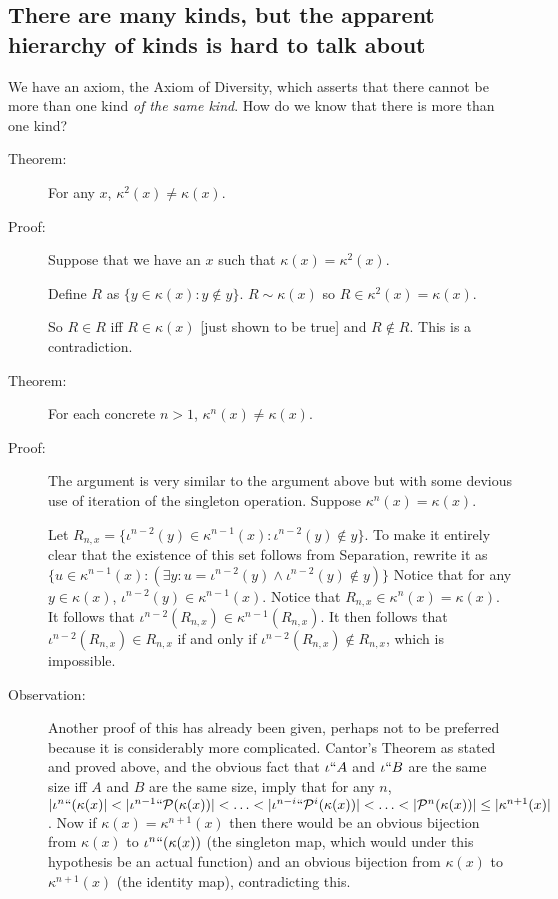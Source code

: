 \documentclass[12pt]{article}
\begin{document}
\subsection{There are many kinds, but the apparent hierarchy of kinds is hard to talk about}

We have an axiom, the Axiom of Diversity, which asserts that there cannot be more than one kind {\em of the same kind\/}.  How do we know that there is more than one kind?

\begin{description}

\item[Theorem:]  For any $x$, $\kappa^2(x) \neq \kappa(x)$.

\item[Proof:]  Suppose that we have an $x$ such that $\kappa(x) = \kappa^2(x)$.

Define $R$ as $\{y \in \kappa(x):y \not\in y\}$.  $R \sim \kappa(x)$ so $R \in \kappa^2(x) = \kappa(x)$.

So $R \in R$ iff $R \in \kappa(x)$ [just shown to be true] and $R \not\in R$.  This is a contradiction.



\item[Theorem:]  For each concrete $n>1$, $\kappa^n(x) \neq \kappa(x)$.

\item[Proof:]  The argument is very similar to the argument above but with some devious use of iteration of the singleton operation.  Suppose $\kappa^n(x)=\kappa(x)$.

Let $R_{n,x} = \{\iota^{n-2}(y)\in \kappa^{n-1}(x):\iota^{n-2}(y) \not\in y\}$.  To make it entirely clear that the existence of this set follows from Separation, rewrite it as $\{u\in \kappa^{n-1}(x):(\exists y:u = \iota^{n-2}(y) \wedge \iota^{n-2}(y) \not\in y)\}$ Notice that
for any $y \in \kappa(x)$, $\iota^{n-2}(y)\in \kappa^{n-1}(x)$.  Notice that $R_{n,x} \in \kappa^n(x) = \kappa(x)$.  It follows that $\iota^{n-2}(R_{n,x})\in \kappa^{n-1}(R_{n,x})$.  It then follows that
$\iota^{n-2}(R_{n,x})\in R_{n,x}$ if and only if $\iota^{n-2}(R_{n,x}) \not\in R_{n,x}$, which is impossible.

\item[Observation:]  Another proof of this has already been given, perhaps not to be preferred because it is considerably more complicated.  Cantor's Theorem as stated and proved above, and the obvious fact that $\iota``A$ and $\iota``B$ are the same size iff $A$ and $B$ are the same size, imply that for any $n$, $|\iota^n``(\kappa(x)| < |\iota^{n-1}``{\cal P}(\kappa(x))| < \ldots <|\iota^{n-i}``{\cal P}^i(\kappa(x))| < \ldots < |{\cal P}^n(\kappa(x))|\leq |\kappa^{n+1}(x)|$.  Now if
$\kappa(x) = \kappa^{n+1}(x)$ then there would be an obvious bijection from $\kappa(x)$ to $\iota^n``(\kappa(x))$ (the singleton map, which would under this hypothesis be an actual function)
and an obvious bijection from $\kappa(x)$ to $\kappa^{n+1}(x)$ (the identity map), contradicting this.

\end{description}
\end{document}
